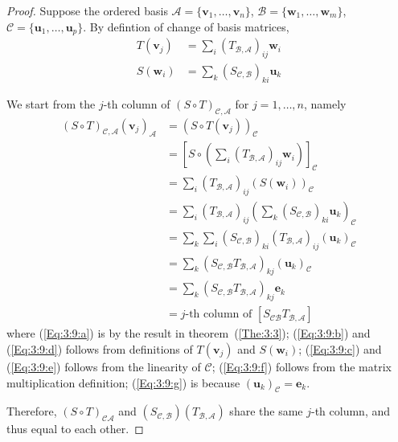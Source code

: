 \begin{proof}
Suppose the ordered basis $\mathcal{A}=\{\bm v_1,\dots,\bm v_n\}$, $\mathcal{B}=\{\bm w_1,\dots,\bm w_m\}$, $\mathcal{C}=\{\bm u_1,\dots,\bm u_p\}$. By defintion of change of basis matrices, 
\begin{align*}
T(\bm v_j)&=\sum_i(T_{\mathcal{B},\mathcal{A}})_{ij}\bm w_i\\
S(\bm w_i)&=\sum_k(S_{\mathcal{C},\mathcal{B}})_{ki}\bm u_k
\end{align*}

We start from the $j$-th column of $(S\circ T)_{\mathcal{C},\mathcal{A}}$ for $j=1,\dots,n$, namely
\begin{subequations}
\begin{align}
(S\circ T)_{\mathcal{C},\mathcal{A}}
(\bm v_j)_{\mathcal{A}}
&=
(S\circ T(\bm v_j))_{\mathcal{C}}\label{Eq:3:9:a}\\
&=
\left[S\circ
\left(
\sum_i(T_{\mathcal{B},\mathcal{A}})_{ij}\bm w_i\right)
\right]_{\mathcal{C}}\label{Eq:3:9:b}\\
&=
\sum_i(T_{\mathcal{B},\mathcal{A}})_{ij}
\left(
S(\bm w_i)
\right)_{\mathcal{C}}\label{Eq:3:9:c}\\
&=
\sum_i(T_{\mathcal{B},\mathcal{A}})_{ij}
\left(
\sum_k(S_{\mathcal{C},\mathcal{B}})_{ki}\bm u_k
\right)_{\mathcal{C}}\label{Eq:3:9:d}\\
&=\sum_k\sum_i(S_{\mathcal{C},\mathcal{B}})_{ki}(T_{\mathcal{B},\mathcal{A}})_{ij}(\bm u_k)_{\mathcal{C}}\label{Eq:3:9:e}\\
&=\sum_k(S_{\mathcal{C},\mathcal{B}}T_{\mathcal{B},\mathcal{A}})_{kj}(\bm u_k)_{\mathcal{C}}\label{Eq:3:9:f}
\\
&=
\sum_k(S_{\mathcal{C},\mathcal{B}}T_{\mathcal{B},\mathcal{A}})_{kj}\bm e_k\label{Eq:3:9:g}\\
&=\text{$j$-th column of }[S_{\mathcal{C}\mathcal{B}}T_{\mathcal{B},\mathcal{A}}]\label{Eq:3:9:h}
\end{align}
\end{subequations}
where (\ref{Eq:3:9:a}) is by the result in theorem~(\ref{The:3:3}); 
(\ref{Eq:3:9:b}) and (\ref{Eq:3:9:d}) follows from definitions of $T(\bm v_j)$ and $S(\bm w_i)$;
(\ref{Eq:3:9:c}) and (\ref{Eq:3:9:e}) follows from the linearity of $\mathcal{C}$;
(\ref{Eq:3:9:f}) follows from the matrix multiplication definition; 
(\ref{Eq:3:9:g}) is because $(\bm u_k)_{\mathcal{C}}=\bm e_k$.

Therefore, $(S\circ T)_{\mathcal{C}\mathcal{A}}$ and $(S_{\mathcal{C},\mathcal{B}})(T_{\mathcal{B},\mathcal{A}})$ share the same $j$-th column, and thus equal to each other.
\end{proof}

